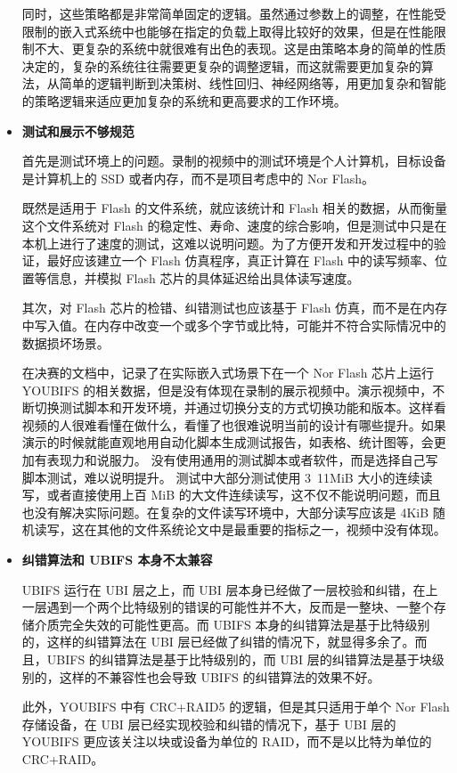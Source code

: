 \begin{itemize}
  同时，这些策略都是非常简单固定的逻辑。虽然通过参数上的调整，在性能受限制的嵌入式系统中也能够在指定的负载上取得比较好的效果，但是在性能限制不大、更复杂的系统中就很难有出色的表现。这是由策略本身的简单的性质决定的，复杂的系统往往需要更复杂的调整逻辑，而这就需要更加复杂的算法，从简单的逻辑判断到决策树、线性回归、神经网络等，用更加复杂和智能的策略逻辑来适应更加复杂的系统和更高要求的工作环境。

  \item {\bf{测试和展示不够规范}}

  首先是测试环境上的问题。录制的视频中的测试环境是个人计算机，目标设备是计算机上的 SSD 或者内存，而不是项目考虑中的 Nor Flash。

  既然是适用于 Flash 的文件系统，就应该统计和 Flash 相关的数据，从而衡量这个文件系统对 Flash 的稳定性、寿命、速度的综合影响，但是测试中只是在本机上进行了速度的测试，这难以说明问题。为了方便开发和开发过程中的验证，最好应该建立一个 Flash 仿真程序，真正计算在 Flash 中的读写频率、位置等信息，并模拟 Flash 芯片的具体延迟给出具体读写速度。

  其次，对 Flash 芯片的检错、纠错测试也应该基于 Flash 仿真，而不是在内存中写入值。在内存中改变一个或多个字节或比特，可能并不符合实际情况中的数据损坏场景。

  在决赛的文档中，记录了在实际嵌入式场景下在一个 Nor Flash 芯片上运行 YOUBIFS 的相关数据，但是没有体现在录制的展示视频中。演示视频中，不断切换测试脚本和开发环境，并通过切换分支的方式切换功能和版本。这样看视频的人很难看懂在做什么，看懂了也很难说明当前的设计有哪些提升。如果演示的时候就能直观地用自动化脚本生成测试报告，如表格、统计图等，会更加有表现力和说服力。
  没有使用通用的测试脚本或者软件，而是选择自己写脚本测试，难以说明提升。
  测试中大部分测试使用 3~11MiB 大小的连续读写，或者直接使用上百 MiB 的大文件连续读写，这不仅不能说明问题，而且也没有解决实际问题。在复杂的文件读写环境中，大部分读写应该是 4KiB 随机读写，这在其他的文件系统论文中是最重要的指标之一，视频中没有体现。

  \item {\bf{纠错算法和 UBIFS 本身不太兼容}}

  UBIFS 运行在 UBI 层之上，而 UBI 层本身已经做了一层校验和纠错，在上一层遇到一个两个比特级别的错误的可能性并不大，反而是一整块、一整个存储介质完全失效的可能性更高。而 UBIFS 本身的纠错算法是基于比特级别的，这样的纠错算法在 UBI 层已经做了纠错的情况下，就显得多余了。而且，UBIFS 的纠错算法是基于比特级别的，而 UBI 层的纠错算法是基于块级别的，这样的不兼容性也会导致 UBIFS 的纠错算法的效果不好。

  此外，YOUBIFS 中有 CRC+RAID5 的逻辑，但是其只适用于单个 Nor Flash 存储设备，在 UBI 层已经实现校验和纠错的情况下，基于 UBI 层的 YOUBIFS 更应该关注以块或设备为单位的 RAID，而不是以比特为单位的 CRC+RAID。

\end{itemize}

